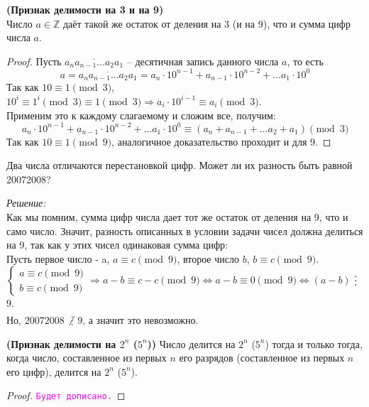 \documentclass[11pt]{article}
\begin{document}
\begin{theorem}\textbf{(Признак делимости на 3 и на 9)}\\
	Число $a \in \mathbb{Z}$ даёт такой же остаток от деления на 3 (и на 9), что и сумма цифр числа $a$.
\end{theorem}

\begin{proof}

	Пусть $\overline{a_na_{n - 1}\ldots a_2 a_1}$ -- десятичная запись данного числа $a$, то есть
	\[a = \overline{a_na_{n - 1}\ldots a_2 a_1} = a_n \cdot 10^{n - 1} + a_{n - 1}\cdot 10^{n - 2} + \ldots a_1 \cdot 10^0 \]
	Так как $10 \equiv 1 \pmod 3$, $10^{i} \equiv 1^{i} \pmod 3 \equiv 1 \pmod 3 \Rightarrow a_i \cdot 10^{i - 1} \equiv a_i \pmod 3$.  \\
	Применим это к каждому слагаемому и сложим все, получим:\\
	\[a_n \cdot 10^{n - 1} + a_{n - 1}\cdot 10^{n - 2} + \ldots a_1 \cdot 10^0 \equiv (a_n + a_{n - 1} + \ldots  a_2 + a_1) \pmod 3\]
	Так как $10 \equiv 1 \pmod{9}$, аналогичное доказательство проходит и для $9$.

\end{proof}

\begin{example}
	
	Два числа отличаются перестановкой цифр. Может ли их разность быть равной 20072008?
	
\end{example}
\textit{Решение:}\\
Как мы помним, сумма цифр числа дает тот же остаток от деления на 9, что и само число. Значит, разность описанных в условии задачи чисел должна делиться на 9, так как у этих чисел одинаковая сумма цифр:\\
Пусть первое число - a, $a \equiv c \pmod 9$, второе число $b$, $b \equiv c \pmod 9$.\\
$\begin{cases}a \equiv c \pmod 9 \\ b \equiv c \pmod 9 \end{cases} \Longrightarrow a - b \equiv c -c \pmod 9 \Longleftrightarrow a - b \equiv 0 \pmod 9 \Longleftrightarrow (a - b)$ $\divisible$ $9$. \\
Но, $20072008$ $\not\divisible$ $9$, а значит это невозможно.\\

\begin{theorem} \textbf{(Признак делимости на $2^n$ ($5^n$))}
	Число делится на $2^n$ ($5^n$) тогда и только тогда, когда число, составленное из первых $n$ его разрядов (составленное из первых $n$
	его цифр), делится на $2^n$ ($5^n$).

\end{theorem}
\begin{proof}
    \textcolor{magenta}{\texttt{Будет дописано.}}
\end{proof}
\end{document}
